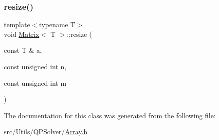\mbox{\label{classMatrix_ae866a1b312aa040b587b40c5f54b6a54}} 
\subsubsection{\texorpdfstring{resize()}{resize()}\hspace{0.1cm}{\footnotesize\ttfamily [2/2]}}
{\footnotesize\ttfamily template$<$typename T$>$ \\
void \mbox{\hyperlink{classMatrix}{Matrix}}$<$ T $>$\+::resize (\begin{DoxyParamCaption}\item[{const T \&}]{a,  }\item[{const unsigned int}]{n,  }\item[{const unsigned int}]{m }\end{DoxyParamCaption})\hspace{0.3cm}{\ttfamily [inline]}}



The documentation for this class was generated from the following file\+:\begin{DoxyCompactItemize}
\item 
src/\+Utils/\+Q\+P\+Solver/\mbox{\hyperlink{Array_8h}{Array.\+h}}\end{DoxyCompactItemize}
